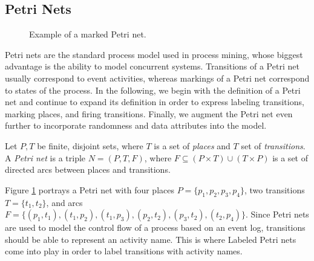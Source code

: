 \subsection{Petri Nets}

\begin{figure}[H]
    \centering
    \caption{Example of a marked Petri net.}
    \label{fig:petrinet}
\end{figure}

Petri nets are the standard process model used in process mining, whose biggest advantage is the ability to model concurrent systems. Transitions of a Petri net usually correspond to event activities, whereas markings of a Petri net correspond to states of the process. In the following, we begin with the definition of a Petri net and continue to expand its definition in order to express labeling transitions, marking places, and firing transitions. Finally, we augment the Petri net even further to incorporate randomness and data attributes into the model.

\begin{definition}
\label{def:petrinet}
    Let $P, T$ be finite, disjoint sets, where $T$ is a set of \emph{places} and $T$ set of \emph{transitions}. A \emph{Petri net} is a triple $N = (P, T, F)$, where $F \subseteq (P \times T) \cup (T \times P)$ is a set of directed arcs between places and transitions.
\end{definition}

Figure \ref{fig:petrinet} portrays a Petri net with four places $P = \{p_1, p_2, p_3, p_4\}$, two transitions $T = \{t_1, t_2\}$, and arcs $F = \{ (p_1, t_1), (t_1, p_2), (t_1, p_3), (p_2, t_2), (p_3, t_2), (t_2, p_4) \}$. Since Petri nets are used to model the control flow of a process based on an event log, transitions should be able to represent an activity name. This is where Labeled Petri nets come into play in order to label transitions with activity names.

